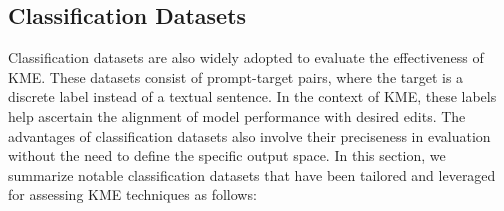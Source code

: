 \documentclass[acmsmall, screen]{acmart}
\begin{document}
\subsection{Classification Datasets}
Classification datasets are also widely adopted to evaluate the effectiveness of KME. These datasets consist of prompt-target pairs, where the target is a discrete label instead of a textual sentence. In the context of KME, these labels help ascertain the alignment of model performance with desired edits.
The advantages of classification datasets also involve their preciseness in evaluation without the need to define the specific output space. In this section, we summarize notable classification datasets that have been tailored and leveraged for assessing KME techniques as follows:
\end{document}
